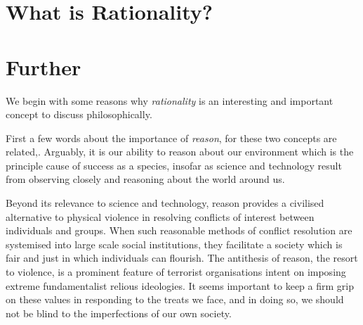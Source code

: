 \documentclass[12pt,titlepage]{article}
\begin{document}
\section{What is Rationality?}



\section{Further}

We begin with some reasons why {\it rationality} is an interesting and important
concept to discuss philosophically.

First a few words about the importance of {\it reason}, for these two concepts are related,.
Arguably, it is our ability to reason about our environment which is the principle cause
of success as a species, insofar as science and technology result from observing closely
and reasoning about the world around us.

Beyond its relevance to science and technology, reason provides a civilised alternative
to physical violence in resolving conflicts of interest between individuals and groups.
When such reasonable methods of conflict resolution are systemised into large scale
social institutions, they facilitate a society which is fair and just in which individuals
can flourish.
The antithesis of reason, the resort to violence, is a prominent feature of terrorist
organisations intent on imposing extreme fundamentalist relious ideologies.
It seems important to keep a firm grip on these values in responding to the treats
we face, and in doing so, we should not be blind to the imperfections of our own
society.










%
%






\end{document}
